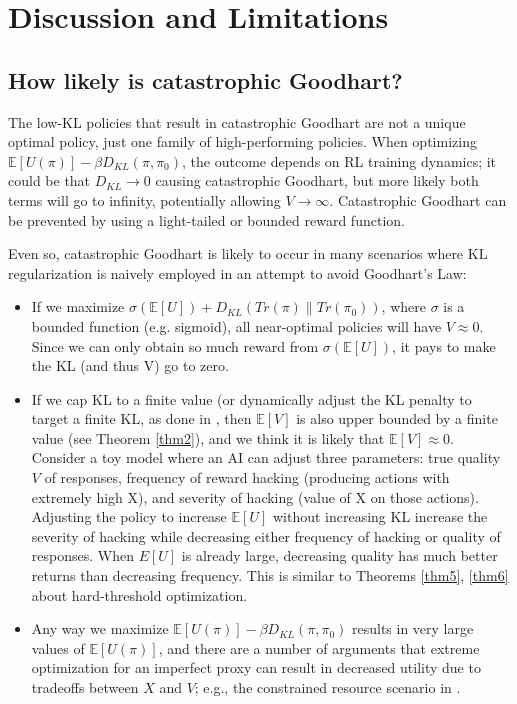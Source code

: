 \documentclass{article}
\begin{document}
\section{Discussion and Limitations\label{sec:discussion}}

\subsection{How likely is catastrophic Goodhart?}

The low-KL policies that result in catastrophic Goodhart are not a unique optimal policy, just one family of high-performing policies. When optimizing $\mathbb{E} [U(\pi)]-\beta D_{K L}\left(\pi, \pi_0 \right)$, the outcome depends on RL training dynamics; it could be that $D_{KL} \to 0$ causing catastrophic Goodhart, but more likely both terms will go to infinity, potentially allowing $V \to \infty$. Catastrophic Goodhart can be prevented by using a light-tailed or bounded reward function.

Even so, catastrophic Goodhart is likely to occur in many scenarios where KL regularization is naively employed in an attempt to avoid Goodhart’s Law:

\begin{itemize}
    \item If we maximize $\sigma(\mathbb E[U]) + D_{KL}(Tr(\pi) \| Tr(\pi_0))$, where $\sigma$ is a bounded function (e.g. sigmoid), all near-optimal policies will have $V \approx 0$. Since we can only obtain so much reward from $\sigma(\mathbb{E}[U])$, it pays to make the KL (and thus V) go to zero.
    \item If we cap KL to a finite value (or dynamically adjust the KL penalty to target a finite KL, as done in \citet{ziegler2020finetuning}, then $\mathbb E[V]$ is also upper bounded by a finite value (see Theorem \ref{thm2}), and we think it is likely that $\mathbb E[V] \approx 0$. Consider a toy model where an AI can adjust three parameters: true quality $V$ of responses, frequency of reward hacking (producing actions with extremely high X), and severity of hacking (value of X on those actions). Adjusting the policy to increase $\mathbb E[U]$ without increasing KL increase the severity of hacking while decreasing either frequency of hacking or quality of responses. When $E[U]$ is already large, decreasing quality has much better returns than decreasing frequency. This is similar to Theorems \ref{thm5}, \ref{thm6} about hard-threshold optimization.
    \item Any way we maximize $\mathbb{E} [U(\pi)]-\beta D_{K L}\left(\pi, \pi_0 \right)$ results in very large values of $\mathbb E[U(\pi)]$, and there are a number of arguments that extreme optimization for an imperfect proxy can result in decreased utility due to tradeoffs between $X$ and $V$; e.g., the constrained resource scenario in \citep{zhuang2021consequences}.
\end{itemize}
\end{document}
